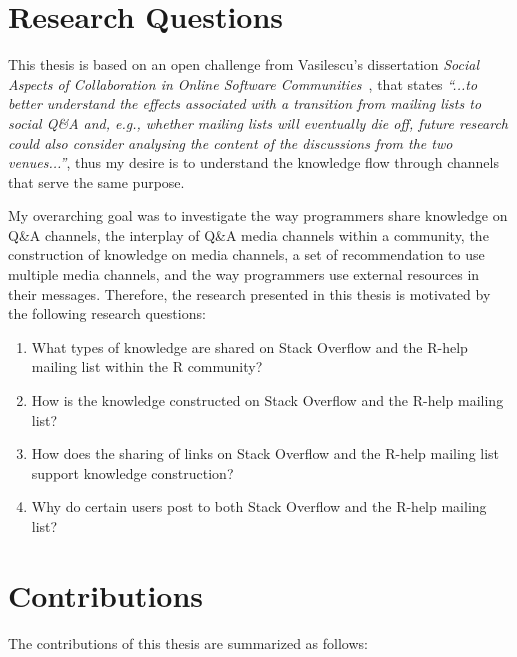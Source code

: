 \documentclass{sig-alternate-05-2015}
\begin{document}
\section{Research Questions}

	This thesis is based on an open challenge from Vasilescu's dissertation \textit{Social Aspects of Collaboration in Online Software Communities}~\cite{Vasilescu2014b}, that states \textit{``...to better understand the effects associated with a transition from mailing lists to social Q\&A and, e.g., whether mailing lists will eventually die off, future research could also consider analysing the content of the discussions from the two venues...''}, thus my desire is to understand the knowledge flow through channels that serve the same purpose. 

	My overarching goal was to investigate the way programmers share knowledge on Q\&A channels, the interplay of Q\&A media channels within a community, the construction of knowledge on media channels, a set of recommendation to use multiple media channels, and the way programmers use external resources in their messages.
	Therefore, the research presented in this thesis is motivated by the following research questions:

	\begin{enumerate}[\bfseries RQ-1.]
		\item What types of knowledge are shared on Stack Overflow and the R-help mailing list within the R community?

		\item How is the knowledge constructed on Stack Overflow and the R-help mailing list? 

		\item How does the sharing of links on Stack Overflow and the R-help mailing list support knowledge construction? 

		\item Why do certain users post to both Stack Overflow and the R-help mailing list?

	\end{enumerate}

\section{Contributions}

	The contributions of this thesis are summarized as follows:
\end{document}
